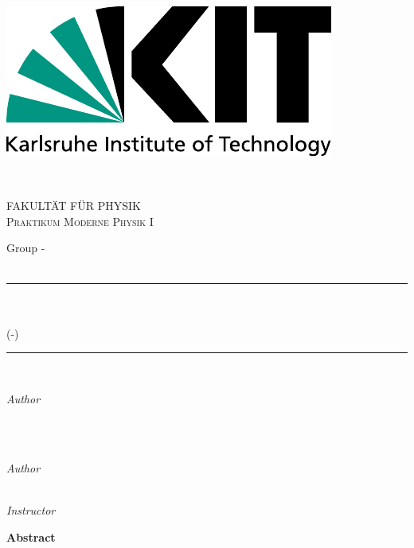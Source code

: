 \begin{titlepage}

	\newcommand{\Hrule}{\rule{\linewidth}{0.5mm}}
	\begin{minipage}{0.5\textwidth}
		\begin{flushleft}
			\includegraphics[width=.5\textwidth]{../praktikum-protokollvorlage-latex/include/logo.pdf}
		\end{flushleft}
	\end{minipage}
	~
	\begin{minipage}{0.5\textwidth}
		\begin{flushright}
			\textsc{FAKULTÄT FÜR PHYSIK\\Praktikum Moderne Physik I}
		\end{flushright}
	\end{minipage}\par

	\center
	{\LARGE Group \wochentag-\gruppennr}\\[1.5cm]
	{\large \durchgefuehrt}\\[0.5cm]

	\Hrule\\[0.4cm]
	{\huge\bfseries \versuch}\\[0.2cm]
	(\praktikum-\versuchsnr)\\[0.4cm]
	\Hrule\\[1.5cm]

	\begin{minipage}{0.4\textwidth}
		\begin{flushleft}
			\large
			\textit{Author}\\
			\vornamea\ \textsc{\nachnamea}\\
			\texttt{\emailA}
		\end{flushleft}
	\end{minipage}
	~
	\begin{minipage}{0.4\textwidth}
		\begin{flushright}
			\large
			\textit{Author}\\
			\vornameb\ \textsc{\nachnameb}\\
			\texttt{\emailB}
		\end{flushright}
	\end{minipage}\par
	\vspace{1cm}
	\textit{Instructor}\\
	\betreuer

	\vfill\vfill
	{\LARGE \textbf{Abstract}}\\[0.4cm]

	\abstract

\end{titlepage}
